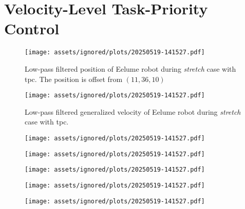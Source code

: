 \FloatBarrier

\newpage
\section{Velocity-Level Task-Priority Control}

\begin{figure}[!ht]
    \centering
    \texttt{[image: assets/ignored/plots/20250519-141527.pdf]}
    \caption[Low-pass filtered position of Eelume robot during \textit{stretch} case with \gls{tpc}]{Low-pass filtered position of Eelume robot during \textit{stretch} case with \gls{tpc}. The position is offset from \((11, 36, 10)\)}
    \label{fig:results:tpc:stretch:1:pos}
\end{figure}
\begin{figure}[!ht]
    \centering
    \texttt{[image: assets/ignored/plots/20250519-141527.pdf]}
    \caption{Low-pass filtered generalized velocity of Eelume robot during \textit{stretch} case with \gls{tpc}.}
    \label{fig:results:tpc:stretch:1:vel}
\end{figure}
\begin{figure}[!ht]
    \centering
    \texttt{[image: assets/ignored/plots/20250519-141527.pdf]}
    \caption{}
    \label{fig:results:tpc:stretch:1:forces}
\end{figure}
\begin{figure}[!ht]
    \centering
    \texttt{[image: assets/ignored/plots/20250519-141527.pdf]}
    \caption{}
    \label{fig:results:tpc:stretch:1:forces-torques}
\end{figure}
\begin{figure}[!ht]
    \centering
    \texttt{[image: assets/ignored/plots/20250519-141527.pdf]}
    \caption{}
    \label{fig:results:tpc:stretch:1:task:1}
\end{figure}
\begin{figure}[!ht]
    \centering
    \texttt{[image: assets/ignored/plots/20250519-141527.pdf]}
    \caption{}
    \label{fig:results:tpc:stretch:1:task:2}
\end{figure}
\begin{figure}[!ht]
    \centering
    \texttt{[image: assets/ignored/plots/20250519-141527.pdf]}
    \caption{}
    \label{fig:results:tpc:stretch:1:task:3}
\end{figure}

